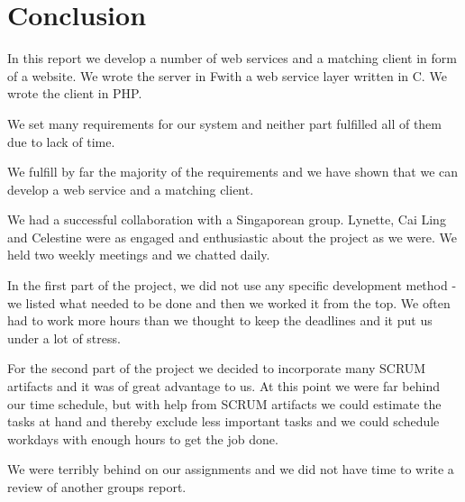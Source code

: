 \section{Conclusion}
In this report we develop a number of web services and a matching client in form of a website. We wrote the server in F\Sh with a web service layer written in C\Sh. We wrote the client in PHP.

We set many requirements for our system and neither part fulfilled all of them due to lack of time.

We fulfill by far the majority of the requirements and we have shown that we can develop a web service and a matching client.

We had a successful collaboration with a Singaporean group. Lynette, Cai Ling and Celestine were as engaged and enthusiastic about the project as we were. We held two weekly meetings and we chatted daily.

In the first part of the project, we did not use any specific development method - we listed what needed to be done and then we worked it from the top. We often had to work more hours than we thought to keep the deadlines and it put us under a lot of stress.

For the second part of the project we decided to incorporate many SCRUM artifacts and it was of great advantage to us. At this point we were far behind our time schedule, but with help from SCRUM artifacts we could estimate the tasks at hand and thereby exclude less important tasks and we could schedule workdays with enough hours to get the job done.

\mbox{}\newline
We were terribly behind on our assignments and we did not have time to write a review of another groups report.
\newpage